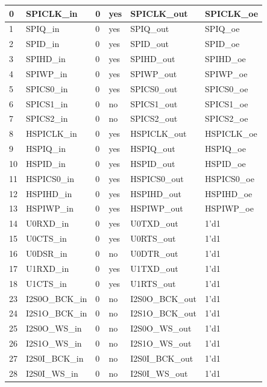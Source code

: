 \begin{longtable}[c]{|p{1cm}|p{3.8cm}|p{2.0cm}|p{2.9cm}|p{4.8cm}|p{3.0cm}| }
        
    0 & SPICLK\_in & 0 & yes & SPICLK\_out & SPICLK\_oe \\ \hline
    1 & SPIQ\_in & 0 & yes & SPIQ\_out & SPIQ\_oe \\ \hline
    2 & SPID\_in & 0 & yes & SPID\_out & SPID\_oe \\ \hline
    3 & SPIHD\_in & 0 & yes & SPIHD\_out & SPIHD\_oe \\ \hline
    4 & SPIWP\_in & 0 & yes & SPIWP\_out & SPIWP\_oe \\ \hline
    5 & SPICS0\_in & 0 & yes & SPICS0\_out & SPICS0\_oe \\ \hline
    6 & SPICS1\_in & 0 & no & SPICS1\_out & SPICS1\_oe \\ \hline
    7 & SPICS2\_in & 0 & no & SPICS2\_out & SPICS2\_oe \\ \hline
    8 & HSPICLK\_in & 0 & yes & HSPICLK\_out & HSPICLK\_oe \\ \hline
    9 & HSPIQ\_in & 0 & yes & HSPIQ\_out & HSPIQ\_oe \\ \hline
    10 & HSPID\_in & 0 & yes & HSPID\_out & HSPID\_oe \\ \hline
    11 & HSPICS0\_in & 0 & yes & HSPICS0\_out & HSPICS0\_oe \\ \hline
    12 & HSPIHD\_in & 0 & yes & HSPIHD\_out & HSPIHD\_oe \\ \hline
    13 & HSPIWP\_in & 0 & yes & HSPIWP\_out & HSPIWP\_oe \\ \hline
    14 & U0RXD\_in & 0 & yes & U0TXD\_out & 1'd1 \\ \hline
    15 & U0CTS\_in & 0 & yes & U0RTS\_out & 1'd1 \\ \hline
    16 & U0DSR\_in & 0 & no & U0DTR\_out & 1'd1 \\ \hline
    17 & U1RXD\_in & 0 & yes & U1TXD\_out & 1'd1 \\ \hline
    18 & U1CTS\_in & 0 & yes & U1RTS\_out & 1'd1 \\ \hline
    23 & I2S0O\_BCK\_in & 0 & no & I2S0O\_BCK\_out & 1'd1 \\ \hline
    24 & I2S1O\_BCK\_in & 0 & no & I2S1O\_BCK\_out & 1'd1 \\ \hline
    25 & I2S0O\_WS\_in & 0 & no & I2S0O\_WS\_out & 1'd1 \\ \hline
    26 & I2S1O\_WS\_in & 0 & no & I2S1O\_WS\_out & 1'd1 \\ \hline
    27 & I2S0I\_BCK\_in & 0 & no & I2S0I\_BCK\_out & 1'd1 \\ \hline
    28 & I2S0I\_WS\_in & 0 & no & I2S0I\_WS\_out & 1'd1 \\ \hline

\end{longtable}
